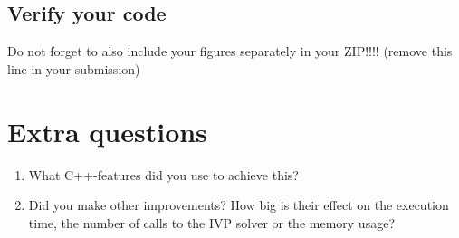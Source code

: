 \documentclass[a4paper]{article}
\newcommand{\answer}[1]{\vspace{-0.75em}\begin{framed} #1 \end{framed}\vspace{-0.75em}}
\begin{document}
\subsection*{Verify your code}
Do not forget to also include your figures separately in your ZIP!!!! (remove this line in your
submission)
\begin{figure}[!h]
	\centering
	\begin{subfigure}{0.49\linewidth}
		\centering
	\end{subfigure}
	\begin{subfigure}{0.49\linewidth}
		\centering
	\end{subfigure}
\end{figure}
\section*{Extra questions}
\begin{enumerate}
	\item What C++-features did you use to achieve this?
	\answer{}
	\item Did you make other improvements? How big is their effect on the execution time, the number of calls to the IVP solver or the memory usage?
	\answer{}
\end{enumerate}
\end{document}
